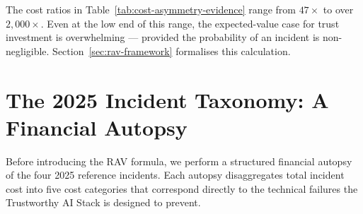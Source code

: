 The cost ratios in Table~\ref{tab:cost-asymmetry-evidence}
range from $47\times$ to over $2{,}000\times$.
Even at the low end of this range, the expected-value case for
trust investment is overwhelming --- provided the probability
of an incident is non-negligible.
Section~\ref{sec:rav-framework} formalises this calculation.

\section{The 2025 Incident Taxonomy: A Financial Autopsy}
\label{sec:incident-taxonomy}

Before introducing the RAV formula, we perform a structured
financial autopsy of the four 2025 reference incidents.
Each autopsy disaggregates total incident cost into five
cost categories that correspond directly to the technical
failures the Trustworthy AI Stack is designed to prevent.

